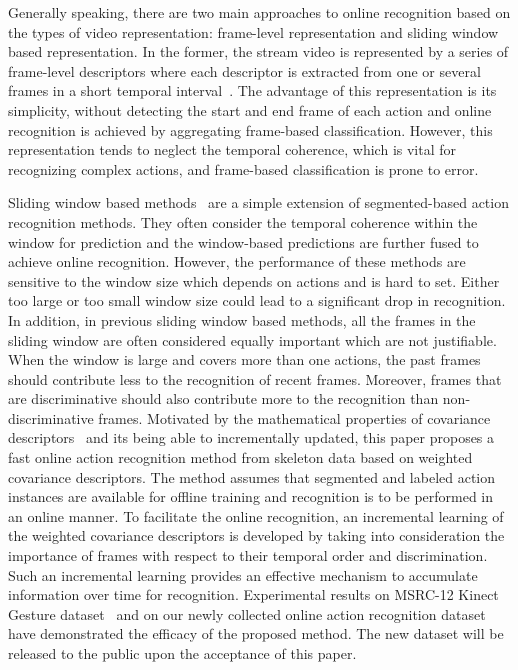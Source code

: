 \documentclass[sigconf]{acmart}
\begin{document}
Generally speaking, there are two main approaches to online recognition based on the types of video representation: frame-level representation and sliding window based representation. In the former, the stream video is represented by a series of frame-level descriptors where each descriptor is extracted from one or several frames in a short temporal interval~\cite{yu2014discriminative,jiang2014online,miranda2014online,hu2016discriminative}. The advantage of this representation is its simplicity, without detecting the start and end frame of each action and online recognition is achieved by aggregating frame-based classification. However, this representation tends to neglect the temporal coherence, which is vital for recognizing complex actions, and frame-based classification is prone to error.

Sliding window based methods~\cite{kviatkovsky2014online,kulkarni2014continuous,zhu2016online} are a simple extension of segmented-based action recognition methods. They often consider the temporal coherence within the window for prediction and the window-based predictions are further fused to achieve online recognition. However, the performance of these methods are sensitive to the window size which depends on actions and is hard to set. Either too large or too small window size could lead to a significant drop in recognition. In addition, in previous sliding window based methods, all the frames in the sliding window are often considered equally important which are not justifiable. When the window is large and covers more than one actions, the past frames should contribute less to the recognition of recent frames. Moreover, frames that are discriminative should also contribute more to the recognition than non-discriminative frames. Motivated by the mathematical properties of covariance descriptors~\cite{hussein2013human,kviatkovsky2014online,sanin2013spatio} and its being able to incrementally updated,
this paper proposes a fast online action recognition method from skeleton data based on weighted covariance descriptors. The method assumes that segmented and labeled action instances are available for offline training and recognition is to be performed in an online manner.
To facilitate the online recognition, an incremental learning of the weighted covariance descriptors is developed by taking into consideration the importance of frames with respect to their temporal order and discrimination. Such an incremental learning provides an effective mechanism to accumulate information over time for recognition.
Experimental results on MSRC-12 Kinect Gesture dataset~\cite{fothergill2012instructing} and on our newly collected online action recognition dataset have demonstrated the efficacy of the proposed method. The new dataset will be released to the public upon the acceptance of this paper.
\end{document}
